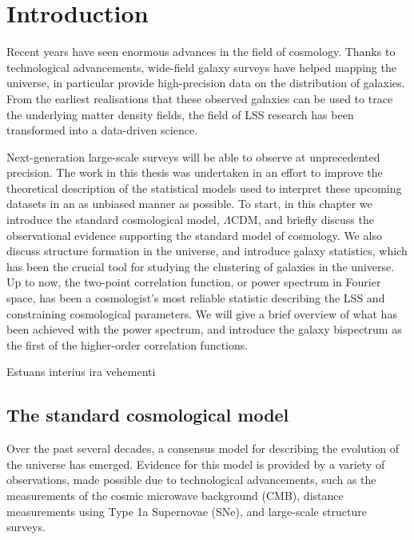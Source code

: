 
\chapter{Introduction}
\label{chapter:introgen}

Recent years have seen enormous advances in the field of cosmology. Thanks to technological advancements, wide-field galaxy surveys have helped mapping the universe, in particular provide high-precision data on the distribution of galaxies. From the earliest realisations that these observed galaxies can be used to trace the underlying matter density fields, the field of LSS research has been transformed into a data-driven science. 

Next-generation large-scale surveys will be able to observe at unprecedented precision. The work in this thesis was undertaken in an effort to improve the theoretical description of the statistical models used to interpret these upcoming datasets in an as unbiased manner as possible. To start, in this chapter we introduce the standard cosmological model, $\Lambda$CDM, and briefly discuss the observational evidence supporting the standard model of cosmology. We also discuss structure formation in the universe, and introduce galaxy statistics, which has been the crucial tool for studying the clustering of galaxies in the universe. Up to now, the two-point correlation function, or power spectrum in Fourier space, has been a cosmologist's most reliable statistic describing the LSS and constraining cosmological parameters. We will give a brief overview of what has been achieved with the power spectrum, and introduce the galaxy bispectrum as the first of the higher-order correlation functions. 

Estuans interius ira vehementi


\section{The standard cosmological model}

Over the past several decades, a consensus model for describing the evolution of the universe has emerged.  Evidence for this model is provided by a variety of observations, made possible due to technological advancements, such as the measurements of the cosmic microwave background (CMB), distance measurements using Type 1a Supernovae (SNe), and large-scale structure surveys. 

